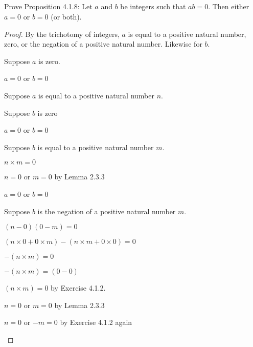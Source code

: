 \documentclass[../../main.tex]{subfiles}
\begin{document}
\subsection{}
\begin{q}
    Prove Proposition 4.1.8: Let $a$ and $b$ be integers such that $ab = 0$. Then either $a = 0$ or $b = 0$ (or both).
\end{q}
\begin{proof}
    By the trichotomy of integers, $a$ is equal to a positive natural number, zero, or the negation of a positive natural number. Likewise for $b$.
    \begin{linebyline}
        \item Suppose $a$ is zero.
        \begin{linebyline}
            \item $a = 0$ or $b = 0$
        \end{linebyline}
        \item Suppose $a$ is equal to a positive natural number $n$.
        \begin{linebyline}
            \item Suppose $b$ is zero
            \begin{linebyline}
                \item $a = 0$ or $b = 0$
            \end{linebyline}
            \item Suppose $b$ is equal to a positive natural number $m$.
            \begin{linebyline}
                \item $n \times m = 0$ 
                \item $n = 0$ or $m = 0$ by Lemma 2.3.3
                \item $a = 0$ or $b = 0$  
            \end{linebyline}
            \item Suppose $b$ is the negation of a positive natural number $m$.
            \item $(n-0)(0-m)=0$
            \item $(n \times 0 + 0 \times m) - (n \times m + 0 \times 0) = 0$
            \item $-(n \times m)=0$
            \item $-(n \times m)=(0-0)$
            \item $(n \times m)=0$ by Exercise 4.1.2.
            \item $n = 0$ or $m = 0$ by Lemma 2.3.3
            \item $n = 0$ or $-m = 0$ by Exercise 4.1.2 again

\end{linebyline}
\end{linebyline}
\end{proof}
\end{document}
